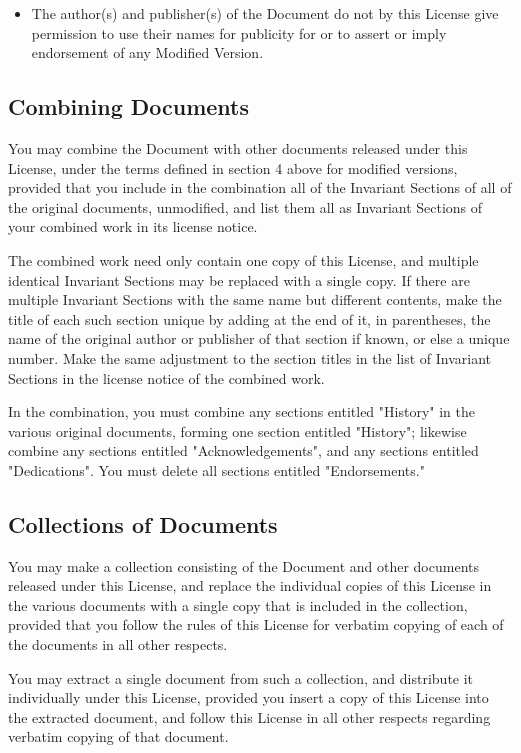 \begin{itemize}
		\item The author(s) and publisher(s) of the Document do not by this License give permission to use their names for publicity for or to assert or imply endorsement of any Modified Version.
	\end{itemize} 

	\subsection{Combining Documents}
	You may combine the Document with other documents released under this License, under the terms defined in section 4 above for modified versions, provided that you include in the combination all of the Invariant Sections of all of the original documents, unmodified, and list them all as Invariant Sections of your combined work in its license notice. 

	The combined work need only contain one copy of this License, and multiple identical Invariant Sections may be replaced with a single copy. If there are multiple Invariant Sections with the same name but different contents, make the title of each such section unique by adding at the end of it, in parentheses, the name of the original author or publisher of that section if known, or else a unique number. Make the same adjustment to the section titles in the list of Invariant Sections in the license notice of the combined work. 

	In the combination, you must combine any sections entitled "History" in the various original documents, forming one section entitled "History"; likewise combine any sections entitled "Acknowledgements", and any sections entitled "Dedications". You must delete all sections entitled "Endorsements." 

	\subsection{Collections of Documents}
	You may make a collection consisting of the Document and other documents released under this License, and replace the individual copies of this License in the various documents with a single copy that is included in the collection, provided that you follow the rules of this License for verbatim copying of each of the documents in all other respects. 

	You may extract a single document from such a collection, and distribute it individually under this License, provided you insert a copy of this License into the extracted document, and follow this License in all other respects regarding verbatim copying of that document. 


